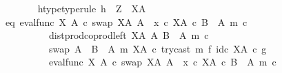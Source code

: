 \begin{isabellebody}
\ \ \ \ \ \ \isamarkupfalse%
\ h{\isacharunderscore}{\kern0pt}type{\isacharbrackleft}{\kern0pt}type{\isacharunderscore}{\kern0pt}rule{\isacharbrackright}{\kern0pt}{\isacharcolon}{\kern0pt}\ {\isachardoublequoteopen}h\ {\isacharcolon}{\kern0pt}\ Z\ {\isasymrightarrow}\ X\isactrlbsup A\isactrlesup {\isachardoublequoteclose}\isanewline
\ \ \ \ \ \ \isamarkupfalse%
\ eq{\isacharcolon}{\kern0pt}\ {\isachardoublequoteopen}{\isacharparenleft}{\kern0pt}{\isacharparenleft}{\kern0pt}eval{\isacharunderscore}{\kern0pt}func\ X\ A\ {\isasymcirc}\isactrlsub c\ swap\ {\isacharparenleft}{\kern0pt}X\isactrlbsup A\isactrlesup {\isacharparenright}{\kern0pt}\ A{\isacharparenright}{\kern0pt}\ {\isasymamalg}\ {\isacharparenleft}{\kern0pt}x\ {\isasymcirc}\isactrlsub c\ {\isasymbeta}\isactrlbsub X\isactrlbsup A\isactrlesup \ {\isasymtimes}\isactrlsub c\ {\isacharparenleft}{\kern0pt}B\ {\isasymsetminus}\ {\isacharparenleft}{\kern0pt}A{\isacharcomma}{\kern0pt}\ m{\isacharparenright}{\kern0pt}{\isacharparenright}{\kern0pt}\isactrlesub {\isacharparenright}{\kern0pt}\ {\isasymcirc}\isactrlsub c\isanewline
\ \ \ \ \ \ \ \ \ \ dist{\isacharunderscore}{\kern0pt}prod{\isacharunderscore}{\kern0pt}coprod{\isacharunderscore}{\kern0pt}left\ {\isacharparenleft}{\kern0pt}X\isactrlbsup A\isactrlesup {\isacharparenright}{\kern0pt}\ A\ {\isacharparenleft}{\kern0pt}B\ {\isasymsetminus}\ {\isacharparenleft}{\kern0pt}A{\isacharcomma}{\kern0pt}\ m{\isacharparenright}{\kern0pt}{\isacharparenright}{\kern0pt}\ {\isasymcirc}\isactrlsub c\isanewline
\ \ \ \ \ \ \ \ \ \ swap\ {\isacharparenleft}{\kern0pt}A\ {\isasymCoprod}\ {\isacharparenleft}{\kern0pt}B\ {\isasymsetminus}\ {\isacharparenleft}{\kern0pt}A{\isacharcomma}{\kern0pt}\ m{\isacharparenright}{\kern0pt}{\isacharparenright}{\kern0pt}{\isacharparenright}{\kern0pt}\ {\isacharparenleft}{\kern0pt}X\isactrlbsup A\isactrlesup {\isacharparenright}{\kern0pt}\ {\isasymcirc}\isactrlsub c\ try{\isacharunderscore}{\kern0pt}cast\ m\ {\isasymtimes}\isactrlsub f\ id\isactrlsub c\ {\isacharparenleft}{\kern0pt}X\isactrlbsup A\isactrlesup {\isacharparenright}{\kern0pt}{\isacharparenright}{\kern0pt}\isactrlsup {\isasymsharp}\ {\isasymcirc}\isactrlsub c\ g\isanewline
\ \ \ \ \ \ \ \ {\isacharequal}{\kern0pt}\isanewline
\ \ \ \ \ \ \ \ \ \ {\isacharparenleft}{\kern0pt}{\isacharparenleft}{\kern0pt}eval{\isacharunderscore}{\kern0pt}func\ X\ A\ {\isasymcirc}\isactrlsub c\ swap\ {\isacharparenleft}{\kern0pt}X\isactrlbsup A\isactrlesup {\isacharparenright}{\kern0pt}\ A{\isacharparenright}{\kern0pt}\ {\isasymamalg}\ {\isacharparenleft}{\kern0pt}x\ {\isasymcirc}\isactrlsub c\ {\isasymbeta}\isactrlbsub X\isactrlbsup A\isactrlesup \ {\isasymtimes}\isactrlsub c\ {\isacharparenleft}{\kern0pt}B\ {\isasymsetminus}\ {\isacharparenleft}{\kern0pt}A{\isacharcomma}{\kern0pt}\ m{\isacharparenright}{\kern0pt}{\isacharparenright}{\kern0pt}\isactrlesub {\isacharparenright}{\kern0pt}\ {\isasymcirc}\isactrlsub c\isanewline

\end{isabellebody}
